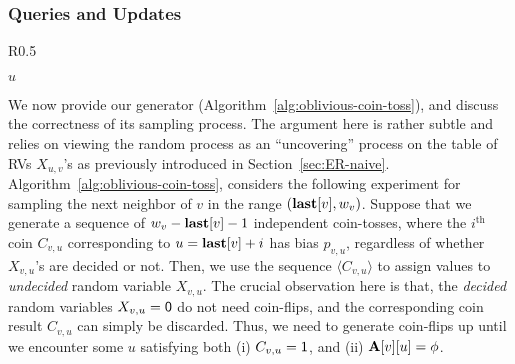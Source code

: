\subsubsection{Queries and Updates}\label{sec:nn-correctness}
\begin{wrapfigure}[15]{R}{0.5\textwidth}
\vspace{-2em}
\begin{framed}
    \renewcommand\figurename{Algorithm}
    \caption{Sampling }
    \label{alg:oblivious-coin-toss}
    \begin{algorithmic}[1]
            \State{$w_v \gets \min \{(P_v \cap (u, n]) \cup \{n+1\}\}$}
            \EndWhile
            \EndIf
            \State \Return $u$
        \EndProcedure
    \end{algorithmic}
\end{framed}
\end{wrapfigure}

We now provide our generator (Algorithm~\ref{alg:oblivious-coin-toss}), and discuss the correctness of its sampling process. The argument here is rather subtle and relies on viewing the random process as an ``uncovering'' process on the table of RVs $X_{u,v}$'s as previously introduced in Section~\ref{sec:ER-naive}.
Algorithm~\ref{alg:oblivious-coin-toss}, considers the following experiment for sampling the next neighbor of $v$ in the range $(\mathbf{last}[v],w_v)$.
Suppose that we generate a sequence of $w_v-\mathbf{last}[v]-1$ independent coin-tosses,
where the $i^\textrm{th}$ coin $C_{v,u}$ corresponding to $u = \mathbf{last}[v]+i$ has bias $p_{v,u}$,
regardless of whether $X_{v,u}$'s are decided or not.
Then, we use the sequence $\langle C_{v,u} \rangle$ to assign values to \emph{undecided} random variable $X_{v,u}$.
The crucial observation here is that, the \emph{decided} random variables $X_{v,u} = \mathsf{0}$ do not need coin-flips, and the corresponding coin result $C_{v,u}$ can simply be discarded.
Thus, we need to generate coin-flips up until we encounter some $u$ satisfying
both (i) $C_{v,u} = \mathsf{1}$, and (ii) $\mathbf{A}[v][u] = \phi$.


